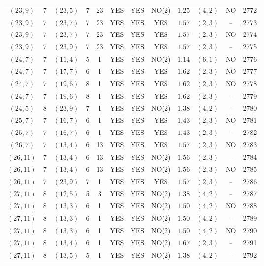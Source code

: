 \begin{longtable}{|c|c|c|c|c|c|c|c|c|c|c|c|}
$(23,9)$ & 7 & $(23,5)$ & 7 & 23 & YES & YES & NO(2) & $1.25$ & $(4,2)$ & NO & 2772\\
$(23,9)$ & 7 & $(23,7)$ & 7 & 23 & YES & YES & YES & $1.57$ & $(2,3)$ & -- & 2773\\
$(23,9)$ & 7 & $(23,7)$ & 7 & 23 & YES & YES & YES & $1.57$ & $(2,3)$ & NO & 2774\\
$(23,9)$ & 7 & $(23,9)$ & 7 & 23 & YES & YES & YES & $1.57$ & $(2,3)$ & -- & 2775\\
$(24,7)$ & 7 & $(11,4)$ & 5 & 1 & YES & YES & NO(2) & $1.14$ & $(6,1)$ & NO & 2776\\
$(24,7)$ & 7 & $(17,7)$ & 6 & 1 & YES & YES & YES & $1.62$ & $(2,3)$ & NO & 2777\\
$(24,7)$ & 7 & $(19,6)$ & 8 & 1 & YES & YES & YES & $1.62$ & $(2,3)$ & NO & 2778\\
$(24,7)$ & 7 & $(19,6)$ & 8 & 1 & YES & YES & YES & $1.62$ & $(2,3)$ & -- & 2779\\
$(24,5)$ & 8 & $(23,9)$ & 7 & 1 & YES & YES & NO(2) & $1.38$ & $(4,2)$ & -- & 2780\\
$(25,7)$ & 7 & $(16,7)$ & 6 & 1 & YES & YES & YES & $1.43$ & $(2,3)$ & NO & 2781\\
$(25,7)$ & 7 & $(16,7)$ & 6 & 1 & YES & YES & YES & $1.43$ & $(2,3)$ & -- & 2782\\
$(26,7)$ & 7 & $(13,4)$ & 6 & 13 & YES & YES & YES & $1.57$ & $(2,3)$ & NO & 2783\\
$(26,11)$ & 7 & $(13,4)$ & 6 & 13 & YES & YES & NO(2) & $1.56$ & $(2,3)$ & -- & 2784\\
$(26,11)$ & 7 & $(13,4)$ & 6 & 13 & YES & YES & NO(2) & $1.56$ & $(2,3)$ & NO & 2785\\
$(26,11)$ & 7 & $(23,9)$ & 7 & 1 & YES & YES & YES & $1.57$ & $(2,3)$ & -- & 2786\\
$(27,11)$ & 8 & $(12,5)$ & 5 & 3 & YES & YES & NO(2) & $1.38$ & $(4,2)$ & -- & 2787\\
$(27,11)$ & 8 & $(13,3)$ & 6 & 1 & YES & YES & NO(2) & $1.50$ & $(4,2)$ & NO & 2788\\
$(27,11)$ & 8 & $(13,3)$ & 6 & 1 & YES & YES & NO(2) & $1.50$ & $(4,2)$ & -- & 2789\\
$(27,11)$ & 8 & $(13,3)$ & 6 & 1 & YES & YES & NO(2) & $1.50$ & $(4,2)$ & NO & 2790\\
$(27,11)$ & 8 & $(13,4)$ & 6 & 1 & YES & YES & NO(2) & $1.67$ & $(2,3)$ & -- & 2791\\
$(27,11)$ & 8 & $(13,5)$ & 5 & 1 & YES & YES & NO(2) & $1.38$ & $(4,2)$ & -- & 2792\\

\end{longtable}
